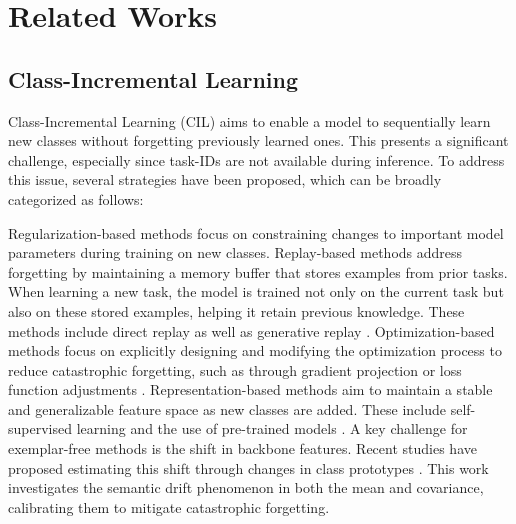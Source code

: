\section{Related Works}
\subsection{Class-Incremental Learning}


Class-Incremental Learning (CIL) aims to enable a model to sequentially learn new classes without forgetting previously learned ones. This presents a significant challenge, especially since task-IDs are not available during inference. To address this issue, several strategies have been proposed, which can be broadly categorized as follows:

Regularization-based methods \cite{li2017learning, rebuffi2017icarl, kirkpatrick2017overcoming, zenke2017continual} focus on constraining changes to important model parameters during training on new classes. Replay-based methods address forgetting by maintaining a memory buffer that stores examples from prior tasks. When learning a new task, the model is trained not only on the current task but also on these stored examples, helping it retain previous knowledge. These methods include direct replay \cite{lopez2017gradient, MER, AGEM, liu2021rmm} as well as generative replay \cite{shin2017continual, Zhu_2021_CVPR}. Optimization-based methods focus on explicitly designing and modifying the optimization process to reduce catastrophic forgetting, such as through gradient projection \cite{farajtabar2020orthogonal, saha2021gradient, lu2024visual} or loss function adjustments \cite{wang2021training, pmlr-v202-wen23b}. Representation-based methods aim to maintain a stable and generalizable feature space as new classes are added. These include self-supervised learning \cite{cha2021co2l, pham2021dualnet} and the use of pre-trained models \cite{wang2022s, Gao2024BeyondPL, mcdonnell2023ranpac}. A key challenge for exemplar-free methods is the shift in backbone features. Recent studies have proposed estimating this shift through changes in class prototypes \cite{yu2020semantic, gomez2025exemplar, goswami2024resurrecting}. This work investigates the semantic drift phenomenon in both the mean and covariance, calibrating them to mitigate catastrophic forgetting.


